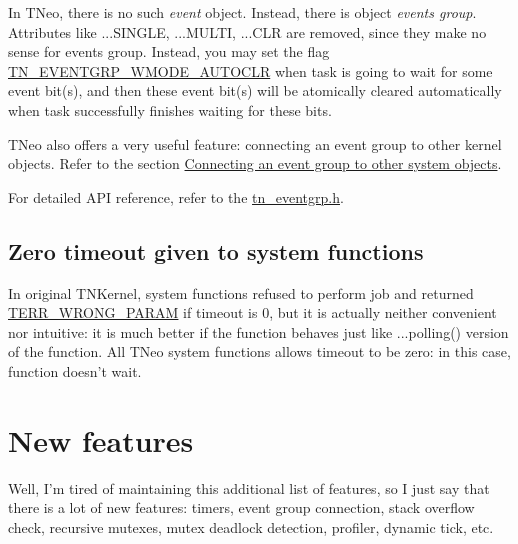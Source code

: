 In T\+Neo, there is no such {\itshape event} object. Instead, there is object {\itshape events group}. Attributes like {\ttfamily ...S\+I\+N\+G\+L\+E}, {\ttfamily ...M\+U\+L\+T\+I}, {\ttfamily ...C\+L\+R} are removed, since they make no sense for events group. Instead, you may set the flag {\ttfamily \hyperlink{tn__eventgrp_8h_a9d42ee61ae8da342f1cd6440b7e54bbdaf45098235d31f72a2b09e30792686573}{T\+N\+\_\+\+E\+V\+E\+N\+T\+G\+R\+P\+\_\+\+W\+M\+O\+D\+E\+\_\+\+A\+U\+T\+O\+C\+L\+R}} when task is going to wait for some event bit(s), and then these event bit(s) will be atomically cleared automatically when task successfully finishes waiting for these bits.

T\+Neo also offers a very useful feature\+: connecting an event group to other kernel objects. Refer to the section \hyperlink{tn__eventgrp_8h_eventgrp_connect}{Connecting an event group to other system objects}.

For detailed A\+P\+I reference, refer to the {\ttfamily \hyperlink{tn__eventgrp_8h}{tn\+\_\+eventgrp.\+h}}.\hypertarget{tnkernel_diff_tnkernel_diff_zero_timeout}{}\subsection{Zero timeout given to system functions}\label{tnkernel_diff_tnkernel_diff_zero_timeout}
In original T\+N\+Kernel, system functions refused to perform job and returned {\ttfamily \hyperlink{tn__oldsymbols_8h_a35ec519d54f884d84c5814f49f00a22b}{T\+E\+R\+R\+\_\+\+W\+R\+O\+N\+G\+\_\+\+P\+A\+R\+A\+M}} if {\ttfamily timeout} is 0, but it is actually neither convenient nor intuitive\+: it is much better if the function behaves just like {\ttfamily ...polling()} version of the function. All T\+Neo system functions allows timeout to be zero\+: in this case, function doesn't wait.\hypertarget{tnkernel_diff_tnkernel_new_features}{}\section{New features}\label{tnkernel_diff_tnkernel_new_features}
Well, I'm tired of maintaining this additional list of features, so I just say that there is a lot of new features\+: timers, event group connection, stack overflow check, recursive mutexes, mutex deadlock detection, profiler, dynamic tick, etc.

